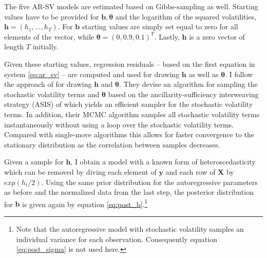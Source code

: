 \documentclass[12pt,letterpaper,fleqn]{article}           %
\begin{document}
The five AR-SV models are estimated based on Gibbs-sampling as well. Starting values have to be provided for $\bm{b}, \bm{\theta}$ and the logarithm of the squared volatilities, $\bm{h} = (h_1,\ldots,h_T)$. For $\bm{b}$ starting values are simply set equal to zero for all elements of the vector, while $\bm{\theta} = (0, 0.9, 0.1)^T$. Lastly, $\bm{h}$ is a zero vector of length $T$ initially.

Given these starting values, regression residuals -- based on the first equation in system \eqref{eq:ar_sv} -- are computed and used for drawing $\bm{h}$ as well as $\bm{\theta}$.  I follow the approach of \textcite{kastner14} for drawing $\bm{h}$ and $\bm{\theta}$. They devise an algorithm for sampling the stochastic volatility terms and $\bm{\theta}$ based on the ancillarity-sufficiency interweaving strategy (ASIS) of \textcite{yu11} %
which yields an efficient sampler for the stochastic volatility terms. In addition, their MCMC algorithm samples all stochastic volatility terms instantaneously without using a loop over the stochastic volatility terms. Compared with single-move algorithms this allows for faster convergence to the stationary distribution as the correlation between samples decreases.

Given a sample for $\mathbf{h}$, I obtain a model with a known form of heteroscedasticity which can be removed by diving each element of $\bm{y}$ and each row of $\bm{X}$ by $exp(h_t / 2)$. Using the same prior distribution for the autoregressive parameters as before and the normalized data from the last step, the posterior distribution for $\bm{b}$ is given again by equation \eqref{eq:post_b}.\footnote{Note that the autoregressive model with stochastic volatility samples an individual variance for each observation. Consequently equation \eqref{eq:post_sigma} is not used here.}
\end{document}
